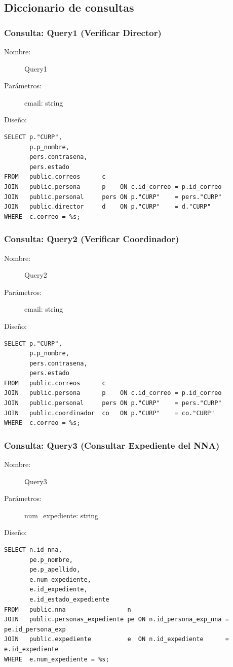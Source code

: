 \subsection{Diccionario de consultas}

\subsubsection{Consulta: Query1 (Verificar Director)}
\begin{description}
    \item[Nombre:] Query1
    \item[Parámetros:] email: string
    \item[Diseño:] \cdtEmpty
\end{description}
\begin{verbatim}
SELECT p."CURP",
       p.p_nombre,
       pers.contrasena,
       pers.estado
FROM   public.correos      c
JOIN   public.persona      p    ON c.id_correo = p.id_correo
JOIN   public.personal     pers ON p."CURP"    = pers."CURP"
JOIN   public.director     d    ON p."CURP"    = d."CURP"
WHERE  c.correo = %s;
\end{verbatim}

\subsubsection{Consulta: Query2 (Verificar Coordinador)}
\begin{description}
    \item[Nombre:] Query2
    \item[Parámetros:] email: string
    \item[Diseño:] \cdtEmpty
\end{description}
\begin{verbatim}
SELECT p."CURP",
       p.p_nombre,
       pers.contrasena,
       pers.estado
FROM   public.correos      c
JOIN   public.persona      p    ON c.id_correo = p.id_correo
JOIN   public.personal     pers ON p."CURP"    = pers."CURP"
JOIN   public.coordinador  co   ON p."CURP"    = co."CURP"
WHERE  c.correo = %s;
\end{verbatim}

\subsubsection{Consulta: Query3 (Consultar Expediente del NNA)}
\begin{description}
    \item[Nombre:] Query3
    \item[Parámetros:] num\_expediente: string
    \item[Diseño:] \cdtEmpty
\end{description}
\begin{verbatim}
SELECT n.id_nna,
       pe.p_nombre,
       pe.p_apellido,
       e.num_expediente,
       e.id_expediente,
       e.id_estado_expediente
FROM   public.nna                 n
JOIN   public.personas_expediente pe ON n.id_persona_exp_nna = pe.id_persona_exp
JOIN   public.expediente          e  ON n.id_expediente      = e.id_expediente
WHERE  e.num_expediente = %s;
\end{verbatim}

